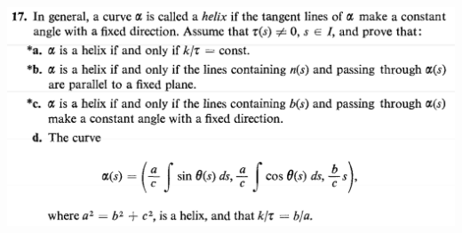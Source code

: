 \documentclass{report}
\begin{document}
\begin{question}{}{}
\includegraphics[height=8cm,width=18cm]{hw2q16}
\end{question}
\end{document}
